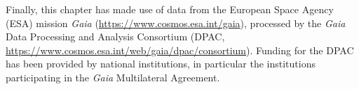 Finally, this chapter has made use of data from the European Space Agency (ESA) mission \textit{Gaia} (\url{https://www.cosmos.esa.int/gaia}), processed by the \textit{Gaia} Data Processing and Analysis Consortium (DPAC, \url{https://www.cosmos.esa.int/web/gaia/dpac/consortium}). Funding for the DPAC has been provided by national institutions, in particular the institutions participating in the \textit{Gaia} Multilateral Agreement.